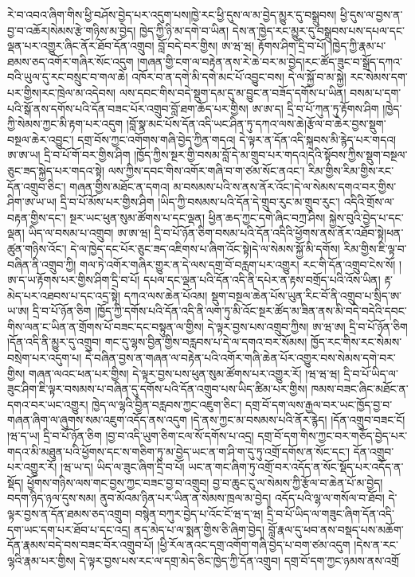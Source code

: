 རེ་བ་འབའ་ཞིག་གིས་ཕྱི་བཤོས་བྱེད་པར་འདུག་པས།ཁྱེ་རང་ཕྱི་དུས་ལ་མ་བྱེད་མྱུར་དུ་བསྒྲུབས། ཕྱི་དུས་ལ་བྱས་ན་བྱ་བ་འཆོར།སེམས་རྩེ་གཉིས་མ་བྱེད། ཁྱེད་ཀྱི་ཉི་མ་དགེ་བ་ཡིན། དེས་ན་ཁྱེད་རང་མྱུར་དུ་བསྒྲུབས་པས་དཔལ་དང་ལྡན་པར་འགྱུར་ཞིང་ནོར་ཐོབ་དོན་འགྲུབ། བློ་བདེ་བར་གྱིས། ཨ་ཝ་ཝ། རྟོགས་ཤིག་དྲི་བ་པོ། །ཁྱེད་ཀྱི་རྣམ་པ་ཐམས་ཅད་འགོར་གཞིར་སོང་འདུག །གཞན་གྱི་ངག་ལ་བརྟེན་ནས་རེ་ཆེ་བར་མ་བྱེད།རང་ཚོད་ཟུང་བ་སྒྲོད་དཀའ་བའི་ཡུལ་དུ་རང་བསྲུང་བ་གལ་ཆེ། འཁོར་བ་ན་དགེ་མི་དགེ་མང་པོ་འབྱུང་བས། དེ་ལ་སྐྱོ་བ་མ་སྐྱེ། རང་སེམས་དག་པར་གྱིས།རང་ཁྲེལ་མ་འདེབས། ལས་དབང་གིས་བདེ་སྡུག་དམ་དུ་མ་བྱུང་ན་བཟོད་དགོས་པ་ཡིན། བསམ་པ་དག་པའི་སྒོ་ནས་དགོས་པའི་དོན་བཟང་པོར་འགྲུབ་བློ་ཐག་ཆོད་པར་གྱིས། ཨ་ཨ་ད། དྲི་བ་པོ་ཀུན་ཏུ་རྟོགས་ཤིག །ཁྱེད་ཀྱི་སེམས་ཀྱང་མི་རྟག་པར་འདུག །བློ་སྣ་མང་པོས་དོན་འདི་ཡང་ཤིན་ཏུ་དཀའ་ལས་ཆེ།རྩོལ་བ་ཆེར་བྱས་སྡུག་བསྔལ་ཆེར་འབྱུང་། དགྲ་བོས་ཀྱང་འགོགས་གཞི་བྱེད་ཀྱིན་གདའ། དེ་ལྟར་ན་དོན་འདི་སྐབས་མི་རྙེད་པར་གདའ། ཨ་ཨ་ཡ། དྲི་བ་པོ་གོ་བར་གྱིས་ཤིག །ཁྱོད་ཀྱིས་སྔར་གྱི་བསམ་བློ་དེ་མ་གྲུབ་པར་གདའ།དེའི་སྟོབས་ཀྱིས་སྡུག་བསྔལ་ཅུང་ཟད་སྐྱེད་པར་གདའ་སྟེ། ལས་ཀྱིས་དབང་གིས་འགོར་གཞི་བ་ག་ཙམ་སོང་ནའང་། རིམ་གྱིས་རིམ་གྱིས་རང་དོན་འགྲུབ་ཅིང་། གཞན་གྱིས་མཐོང་ན་དགའ། མ་བསམས་པའི་ས་ནས་ནོར་འོང་།དེ་ལ་སེམས་དགའ་བར་གྱིས་ཤིག་ཨ་ཡ་ཡ། དྲི་བ་པོ་མོས་པར་གྱིས་ཤིག །ཡིད་ཀྱི་བསམས་པའི་དོན་དེ་གྲུབ་རུང་མ་གྲུབ་རུང་། འདིའི་གྲོས་ལ་བརྟན་གྱིས་དང་། སྔར་ཡང་ཕུན་སུམ་ཚོགས་པ་དང་ལྡན། ཕྱིན་ཆད་ཀྱང་དགེ་ཞིང་བཀྲ་ཤིས། སྐྱེས་བུའི་བྱེད་པ་དང་ལྡན། ཡིད་ལ་བསམ་པ་འགྲུབ། ཨ་ཨ་ཝ། དྲི་བ་པོ་ཉོན་ཅིག་བསམ་པའི་དོན་འདིའི་ཕྱོགས་ནས་ནོར་འཐོབ་སྟེ།ཕན་ཚུན་གཉིས་འོང་། དེ་ལ་ཁྱེད་དང་པོར་ཅུང་ཟད་འཇིགས་པ་ཞིག་འོང་སྟེ།དེ་ལ་སེམས་སྐྱོ་མི་དགོས། རིམ་གྱིས་ཇི་ལྟ་བ་བཞིན་ནི་འགྲུབ་ཀྱི། གལ་ཏེ་འགོར་གཞིར་གྱུར་ན་དེ་ལས་དགྲ་བོ་བརླག་པར་འགྱུར། རང་གི་དོན་འགྲུབ་ངེས་སོ། །ཨ་ད་ཡ་རྟོགས་པར་གྱིས་ཤིག་དྲི་བ་པོ། དཔལ་དང་ལྡན་པའི་དོན་འདི་ནི་དཔེར་ན་རྟས་བགྲོད་པའི་འོས་ཡིན། རྟ་མེད་པར་འཐབས་པ་དང་འདྲ་སྟེ། དཀའ་ལས་ཆེན་པོའམ། སྡུག་བསྔལ་ཆེན་པོས་ཡུན་རིང་བོ་ནི་འགྲུབ་པ་སྲིད་ཨ་ཡ་ཨ། དྲི་བ་པོ་ཉོན་ཅིག །ཁྱོད་ཀྱི་དགོས་པའི་དོན་འདི་ནི་ལག་ཏུ་མི་འོང་སྔར་ཚོད་མ་ཟིན་ནས་མི་བདེ་བདེའི་དབང་གིས་ལན་ང་ཡིན་ན་གྲོགས་པོ་བཟང་དང་བསྟུན་ལ་གྱིས། དེ་ལྟར་བྱས་པས་འགྲུབ་ཀྱིས། ཨ་ཝ་ཨ། དྲི་བ་པོ་ཉོན་ཅིག །དོན་འདི་ནི་མྱུར་དུ་འགྲུབ། གང་དུ་ལྷས་བྱིན་གྱིས་བརླབས་པ་དེ་ལ་དགའ་བར་སོམས། ཁྱོད་རང་གིས་རང་སེམས་བསྲེག་པར་འདུག་པ། དེ་བཞིན་བྱས་ན་གཞན་ལ་བརྟེན་པའི་འགོར་གཞི་ཆེན་པོར་འགྱུར་བས་སེམས་དགེ་བར་གྱིས། གཞན་ལའང་ཕན་པར་གྱིས། དེ་ལྟར་བྱས་པས་ཕུན་སུམ་ཚོགས་པར་འགྱུར་རོ། །ཝ་ཝ་ཝ། དྲི་བ་པོ་ཡིད་ལ་ཟུང་ཤིག་ཇི་ལྟར་བསམས་པ་བཞིན་དུ་དགོས་པའི་དོན་འགྲུབ་པས་ཡིད་ཚིམ་པར་གྱིས། ཁམས་བཟང་ཞིང་མཐོང་ན་དགའ་བར་ཡང་འགྱུར། ཁྱེད་ལ་ལྷའི་བྱིན་བརླབས་ཀྱང་འཇུག་ཅིང་། དགྲ་བོ་དག་ལས་རྒྱལ་བར་ཡང་ཁྱོད་བྱ་བ་གཞན་ཞིག་ལ་ཞུགས་སམ་འཇུག་འདོད་ནས་འདུག །དེ་ནས་ཀྱང་མ་བསམས་པའི་ནོར་རྙེད། །དོན་འགྲུབ་བཟང་ངོ། །ཝ་ད་ཡ། དྲི་བ་པོ་ཉོན་ཅིག །བྱ་བ་འདི་ཡུག་ཅིག་ངལ་སོ་དགོས་པ་འདྲ། དགྲ་བོ་དག་གིས་ཀྱང་བར་གཅོད་བྱེད་པར་གདའ་མི་མཐུན་པའི་ཕྱོགས་དང་ས་གཅིག་ཏུ་མ་བྱེད་ཡང་ན་ག་ཤི་ག་དུ་ཏུ་འགྲོ་དགོས་ན་སོང་དང་། དོན་འགྲུབ་པར་འགྱུར་རོ། །ཝ་ཡ་ད། ཡིད་ལ་ཟུང་ཞིག་དྲི་བ་པོ། ཡང་ན་གང་ཞིག་ཏུ་འགྲོ་བར་འདོད་ན་སོང་སྡོད་པར་འདོད་ན་སྡོད། ཕྱོགས་གཉིས་ལས་གང་བྱས་ཀྱང་བཟང་བྱ་བ་འགྲུབ། བྱ་བ་ཆུང་ངུ་ལ་སེམས་ཀྱི་རྩོལ་བ་ཆེན་པོ་མ་བྱེད། བདག་ཉིད་ཉལ་དུས་སམ། ནུབ་མོའམ་ཉིན་པར་ཡིན་ན་སེམས་ཁྲལ་མ་བྱེད། འདོད་པའི་ལྷ་ལ་གསོལ་བ་ཐོབ། དེ་ལྟར་བྱས་ན་དོན་ཐམས་ཅད་འགྲུབ། བསྙེན་བཀུར་བྱེད་པ་འོང་ངོ་ཝ་ད་ཝ། དྲི་བ་པོ་ཡིད་ལ་གཟུང་ཞིག་དོན་འདི་དག་ཡང་དག་པར་ཐོབ་པ་དང་འདྲ། ནད་མེད་པ་ལ་སྨན་གྱིས་ཅི་ཞིག་བྱེད། བློ་རྣལ་དུ་ཕབ་ནས་བསྡད་པས་མཆོག་དོན་རྣམས་བདེ་བས་བཟང་བོར་འགྲུབ་པོ། །ཕྱི་རོལ་ནའང་དགྲ་འགོག་གཞི་བྱེད་པ་བག་ཙམ་འདུག །དེས་ན་རང་ལྷའི་རྣམ་པར་གྱིས། དེ་ལྟར་བྱས་པས་རང་ལ་དགྲ་མེད་ཅིང་ཁྱེད་ཀྱི་དོན་འགྲུབ། དགྲ་བོ་དག་ཀྱང་ཉམས་ནས་འགྲོ 